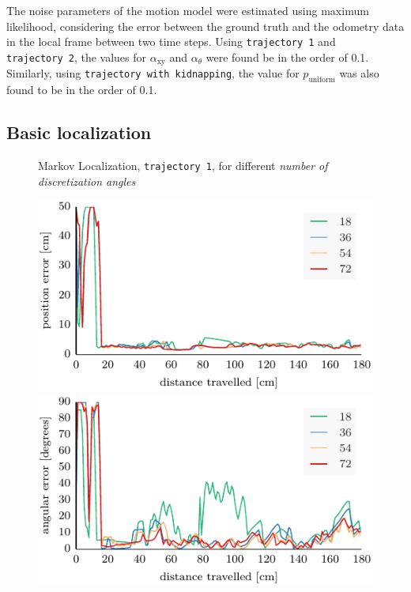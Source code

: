 \documentclass[letterpaper, 10pt, conference]{ieeeconf}
\begin{document}
The noise parameters of the motion model were estimated using maximum likelihood, considering the error between the ground truth and the odometry data in the local frame between two time steps.
Using \texttt{trajectory~1} and \texttt{trajectory~2}, the values for  $\alpha_\mathrm{xy}$ and $\alpha_\theta$ were found be in the order of 0.1.
Similarly, using \texttt{trajectory with kidnapping}, the value for $p_\mathrm{uniform}$ was also found to be in the order of 0.1.

\subsection{Basic localization}

\begin{figure}

\begin{center}
Markov Localization, \texttt{trajectory~1}, for different \emph{number of discretization angles}
\end{center}
\includegraphics{ml-whole_random_1-xy}\hfill
\includegraphics{ml-whole_random_1-theta}


\end{figure}
\end{document}
